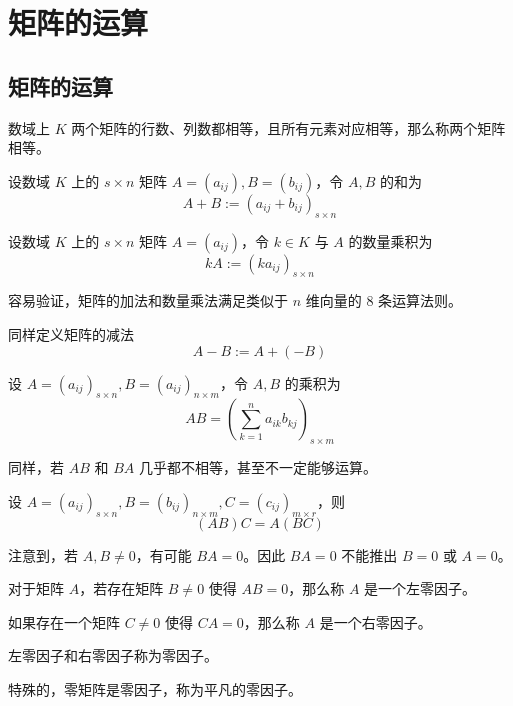 \chapter{矩阵的运算}

\section{矩阵的运算}

数域上 $K$ 两个矩阵的行数、列数都相等，且所有元素对应相等，那么称两个矩阵相等。

\begin{definition}
    设数域 $K$ 上的 $s\times n$ 矩阵 $A=(a_{ij}),B=(b_{ij})$，令 $A,B$ 的和为
    $$A+B := (a_{ij}+b_{ij})_{s\times n}$$
\end{definition}

\begin{definition}
    设数域 $K$ 上的 $s\times n$ 矩阵 $A=(a_{ij})$，令 $k\in K$ 与 $A$ 的数量乘积为
    $$kA := (ka_{ij})_{s\times n}$$
\end{definition}

容易验证，矩阵的加法和数量乘法满足类似于 $n$ 维向量的 8 条运算法则。

同样定义矩阵的减法
$$A-B := A+(-B)$$

\begin{definition}
    设 $A=(a_{ij})_{s\times n},B=(a_{ij})_{n\times m}$，令 $A,B$ 的乘积为
    $$AB = \left(\sum_{k=1}^na_{ik}b_{kj}\right)_{s\times m}$$
\end{definition}

同样，若 $AB$ 和 $BA$ 几乎都不相等，甚至不一定能够运算。

\begin{theorem}
    设 $A=(a_{ij})_{s\times n},B=(b_{ij})_{n\times m},C=(c_{ij})_{m\times r}$，则
    $$(AB)C = A(BC)$$
\end{theorem}

注意到，若 $A,B\ne 0$，有可能 $BA = 0$。因此 $BA = 0$ 不能推出 $B=0$ 或 $A=0$。

\begin{definition}[零因子]
    对于矩阵 $A$，若存在矩阵 $B\ne 0$ 使得 $AB = 0$，那么称 $A$ 是一个左零因子。
    
    如果存在一个矩阵 $C\ne 0$ 使得 $CA = 0$，那么称 $A$ 是一个右零因子。
    
    左零因子和右零因子称为零因子。 
\end{definition}

特殊的，零矩阵是零因子，称为平凡的零因子。

